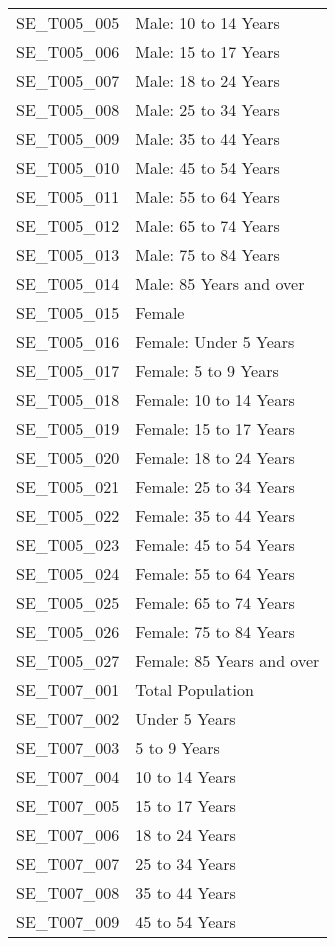 \begin{longtable}{rp{5in}}
  SE\_T005\_005 & Male: 10 to 14 Years \\ 
  SE\_T005\_006 & Male: 15 to 17 Years \\ 
  SE\_T005\_007 & Male: 18 to 24 Years \\ 
  SE\_T005\_008 & Male: 25 to 34 Years \\ 
  SE\_T005\_009 & Male: 35 to 44 Years \\ 
  SE\_T005\_010 & Male: 45 to 54 Years \\ 
  SE\_T005\_011 & Male: 55 to 64 Years \\ 
  SE\_T005\_012 & Male: 65 to 74 Years \\ 
  SE\_T005\_013 & Male: 75 to 84 Years \\ 
  SE\_T005\_014 & Male: 85 Years and over \\ 
  SE\_T005\_015 & Female \\ 
  SE\_T005\_016 & Female: Under 5 Years \\ 
  SE\_T005\_017 & Female: 5 to 9 Years \\ 
  SE\_T005\_018 & Female: 10 to 14 Years \\ 
  SE\_T005\_019 & Female: 15 to 17 Years \\ 
  SE\_T005\_020 & Female: 18 to 24 Years \\ 
  SE\_T005\_021 & Female: 25 to 34 Years \\ 
  SE\_T005\_022 & Female: 35 to 44 Years \\ 
  SE\_T005\_023 & Female: 45 to 54 Years \\ 
  SE\_T005\_024 & Female: 55 to 64 Years \\ 
  SE\_T005\_025 & Female: 65 to 74 Years \\ 
  SE\_T005\_026 & Female: 75 to 84 Years \\ 
  SE\_T005\_027 & Female: 85 Years and over \\ 
  SE\_T007\_001 & Total Population \\ 
  SE\_T007\_002 & Under 5 Years \\ 
  SE\_T007\_003 & 5 to 9 Years \\ 
  SE\_T007\_004 & 10 to 14 Years \\ 
  SE\_T007\_005 & 15 to 17 Years \\ 
  SE\_T007\_006 & 18 to 24 Years \\ 
  SE\_T007\_007 & 25 to 34 Years \\ 
  SE\_T007\_008 & 35 to 44 Years \\ 
  SE\_T007\_009 & 45 to 54 Years \\ 

\end{longtable}

